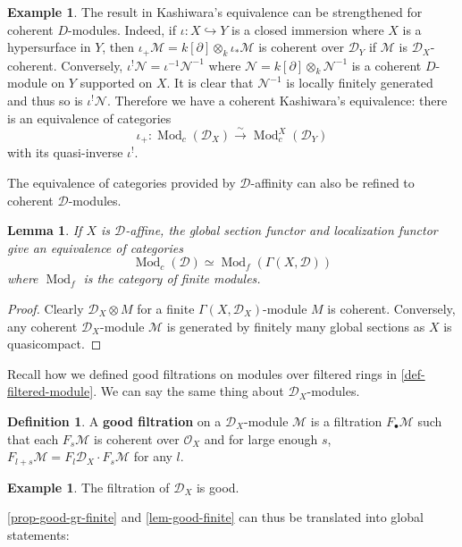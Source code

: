 \documentclass[11pt, a4paper]{article}
\newtheorem{lemma}[theorem]{Lemma}
\theoremstyle{definition}
\newtheorem{example}[theorem]{Example}
\newtheorem{definition}[theorem]{Definition}
\newcommand{\Mod}{\operatorname{Mod}}
\begin{document}
    \begin{example}
        The result in Kashiwara's equivalence can be strengthened for coherent $D$-modules. Indeed, if $\iota:X\hookrightarrow Y$ is a closed immersion where $X$ is a hypersurface in $Y$, then $\iota_+\mathcal M=k[\partial]\otimes_k\iota_*\mathcal M$ is coherent over $\mathcal D_Y$ if $\mathcal M$ is $\mathcal D_X$-coherent. Conversely, $\iota^!\mathcal N=\iota^{-1}\mathcal N^{-1}$ where $\mathcal N=k[\partial]\otimes_k\mathcal N^{-1}$ is a coherent $D$-module on $Y$ supported on $X$. It is clear that $\mathcal N^{-1}$ is locally finitely generated and thus so is $\iota^!\mathcal N$. Therefore we have a coherent Kashiwara's equivalence: there is an equivalence of categories
        \[\iota_+:\Mod_c(\mathcal D_X)\xrightarrow{\sim}\Mod_c^X(\mathcal D_Y)\]
        with its quasi-inverse $\iota^!$.
    \end{example}
    The equivalence of categories provided by $\mathcal D$-affinity can also be refined to coherent $\mathcal D$-modules.
    \begin{lemma}\label{lem-coh-fin-equiv}
        If $X$ is $\mathcal D$-affine, the global section functor and localization functor give an equivalence of categories
        \[\Mod_c(\mathcal D)\simeq\Mod_f(\Gamma(X, \mathcal D))\]
        where $\Mod_f$ is the category of finite modules.
    \end{lemma}
    \begin{proof}
        Clearly $\mathcal D_X\otimes M$ for a finite $\Gamma(X, \mathcal D_X)$-module $M$ is coherent. Conversely, any coherent $\mathcal D_X$-module $\mathcal M$ is generated by finitely many global sections as $X$ is quasicompact.
    \end{proof}
    Recall how we defined good filtrations on modules over filtered rings in \cref{def-filtered-module}. We can say the same thing about $\mathcal D_X$-modules.
    \begin{definition}
        A \textbf{good filtration} on a $\mathcal D_X$-module $\mathcal M$ is a filtration $F_\bullet\mathcal M$ such that each $F_s\mathcal M$ is coherent over $\mathcal O_X$ and for large enough $s$, $F_{l+s}\mathcal M=F_l\mathcal D_X\cdot F_s\mathcal M$ for any $l$.
    \end{definition}
    \begin{example}
        The filtration of  $\mathcal D_X$ is good.
    \end{example}
    \cref{prop-good-gr-finite} and \cref{lem-good-finite} can thus be translated into global statements:
\end{document}
